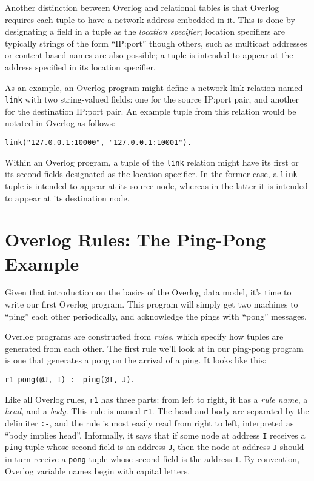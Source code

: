 \documentclass{article}
\begin{document}
Another distinction between Overlog and relational tables is that
Overlog requires each tuple to have a network address embedded in it.
This is done by designating a field in a tuple as the \emph{location
  specifier}; location specifiers are typically strings of the form
``IP:port'' though others, such as multicast addresses or content-based
names are also possible; a tuple is intended to appear at the
address specified in its location specifier. 

As an example, an Overlog program might define a network link relation
named \lstinline$link$ with two string-valued fields: one for the
source IP:port pair, and another for the destination IP:port pair.  An
example tuple from this relation would be notated in Overlog as
follows:
\begin{lstlisting}
link("127.0.0.1:10000", "127.0.0.1:10001").
\end{lstlisting}

Within an Overlog program, a tuple of the \lstinline$link$ relation
might have its first or its second fields designated as the location
specifier. In the former case, a \lstinline$link$ tuple is intended to
appear at its source node, whereas in the latter it is intended to
appear at its destination node.



\section{Overlog Rules: The Ping-Pong Example}
\label{sec:pingPong}
Given that introduction on the basics of the Overlog data model, it's
time to write our first Overlog program.  This program will simply get
two machines to ``ping'' each other periodically, and acknowledge the
pings with ``pong'' messages.

Overlog programs are constructed from {\em rules}, which specify how
tuples are generated from each other.  The first rule we'll look at in
our ping-pong program is one that generates a pong on the arrival of a
ping.  It looks like this:
\begin{lstlisting}
r1 pong(@J, I) :- ping(@I, J).
\end{lstlisting}
Like all Overlog rules, \lstinline$r1$ has three parts: from left to
right, it has a {\em rule name}, a {\em head}, and a {\em body}. This
rule is named \lstinline$r1$.  The head and body are separated by the
delimiter \lstinline$:-$, and the rule is most easily read from right
to left, interpreted as ``body implies head''.  Informally, it says
that if some node at address \lstinline$I$ receives a \lstinline$ping$
tuple whose second field is an address \lstinline$J$, then the node at
address \lstinline$J$ should in turn receive a \lstinline$pong$ tuple
whose second field is the address \lstinline$I$.  By convention,
Overlog variable names begin with capital letters.
\end{document}
